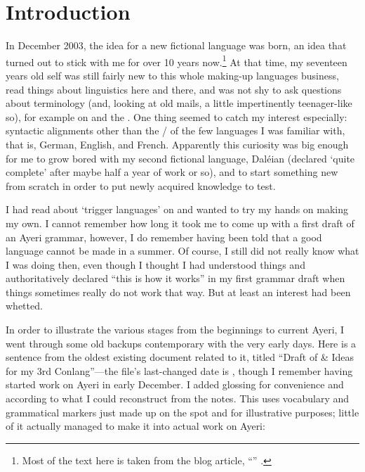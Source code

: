\setcounter{chapter}{-1}
\chapter{Introduction}

In December 2003, the idea for a new fictional language was born, an idea that 
turned out to stick with me for over 10 years now.\footnote{Most of the text 
here is taken from the blog article, ``'' 
\parencite{benung:happybirthday}.} At that time, my seventeen years old self 
was still fairly new to this whole making-up languages business, read things 
about linguistics here and there, and was not shy to ask questions about 
terminology (and, looking at old mails, a little impertinently teenager-like 
so), for example on  and the . One 
thing seemed to catch my interest especially: syntactic alignments other than 
the \Nom{}/\Acc{} of the few languages I was familiar with, that is, German, 
English, and French. Apparently this curiosity was big enough for me to grow 
bored with my second fictional language, Daléian (declared `quite complete' 
after maybe half a year of work or so), and to start something new from scratch 
in order to put newly acquired knowledge to test.

I had read about `trigger languages' on  and wanted to try my 
hands on making my own. I cannot remember how long it took me to come up with a 
first draft of an Ayeri grammar, however, I do remember having been told that a 
good language cannot be made in a summer. Of course, I still did not really 
know what I was doing then, even though I thought I had understood things and 
authoritatively declared ``this is how it works'' in my first grammar draft 
when things sometimes really do not work that way. But at least an interest had 
been whetted.

In order to illustrate the various stages from the beginnings to current Ayeri,
I went through some old backups contemporary with the very early days. 
Here is a sentence from the oldest existing document related to it, titled 
``Draft of \& Ideas for my 3rd Conlang''---the file's last-changed date is 
, though I remember having started work on Ayeri in early 
December. I added glossing for convenience and according to what I could 
reconstruct from the notes. This uses vocabulary and grammatical markers just 
made up on the spot and for illustrative purposes; little of it actually 
managed to make it into actual work on Ayeri:

